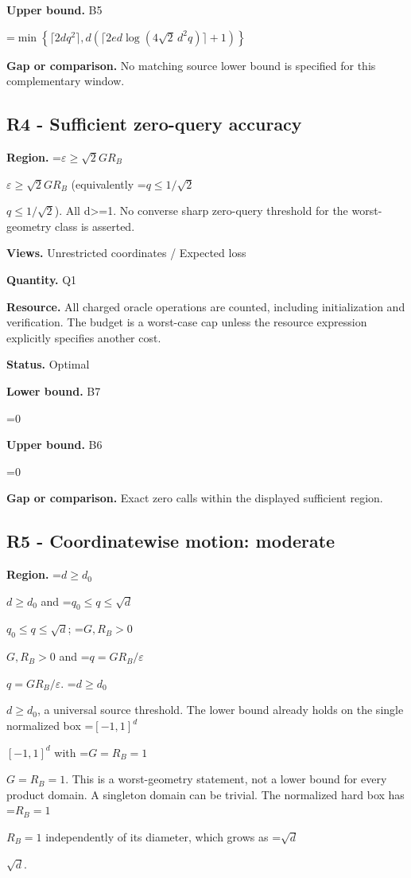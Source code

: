 \documentclass[10pt,a4paper]{article}
\newcommand{\AtlasMath}[1]{\par\begingroup\centering\setbox0=\hbox{$\displaystyle #1$}\ifdim\wd0>1.4\linewidth\typeout{ATLAS WIDE FORMULA: \the\wd0}\fi\ifdim\wd0>\linewidth\resizebox{\linewidth}{!}{\box0}\else\box0\fi\par\endgroup}
\newcommand{\AtlasInlineMath}[1]{\begingroup\setbox0=\hbox{$#1$}\ifdim\wd0>.4\linewidth\endgroup\AtlasMath{#1}\else\endgroup$#1$\fi}
\begin{document}
\textbf{Upper bound.} B5



\AtlasMath{\min\left\{\lceil2dq^2\rceil,d\left(\lceil2ed\log(4\sqrt2\,d^2q)\rceil+1\right)\right\}}


\textbf{Gap or comparison.} No matching source lower bound is specified for this complementary window.



\subsection{R4 - Sufficient zero-query accuracy}


\textbf{Region.} \AtlasInlineMath{\varepsilon\ge\sqrt2GR_B} (equivalently \AtlasInlineMath{q\le1/\sqrt2}). All d>=1. No converse sharp zero-query threshold for the worst-geometry class is asserted.



\textbf{Views.} Unrestricted coordinates / Expected loss



\textbf{Quantity.} Q1



\textbf{Resource.} All charged oracle operations are counted, including initialization and verification. The budget is a worst-case cap unless the resource expression explicitly specifies another cost.



\textbf{Status.} Optimal



\textbf{Lower bound.} B7



\AtlasMath{0}


\textbf{Upper bound.} B6



\AtlasMath{0}


\textbf{Gap or comparison.} Exact zero calls within the displayed sufficient region.



\subsection{R5 - Coordinatewise motion: moderate}


\textbf{Region.} \AtlasInlineMath{d\ge d_0} and \AtlasInlineMath{q_0\le q\le\sqrt d}; \AtlasInlineMath{G,R_B>0} and \AtlasInlineMath{q=GR_B/\varepsilon}. \AtlasInlineMath{d\ge d_0}, a universal source threshold. The lower bound already holds on the single normalized box \AtlasInlineMath{[-1,1]^d} with \AtlasInlineMath{G=R_B=1}. This is a worst-geometry statement, not a lower bound for every product domain. A singleton domain can be trivial. The normalized hard box has \AtlasInlineMath{R_B=1} independently of its diameter, which grows as \AtlasInlineMath{\sqrt d}.
\end{document}
